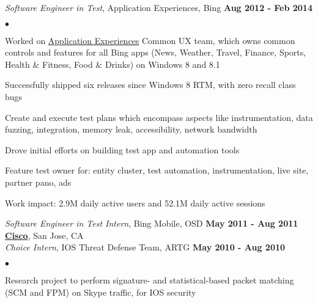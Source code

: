 \documentclass[margin,line]{res}
\newenvironment{list2}
  {\vspace{-4mm}
   \begin{list}{$\bullet$}{
     \setlength{\itemsep}{0in}
     \setlength{\parsep}{0in} \setlength{\parskip}{0in}
     \setlength{\topsep}{0in} \setlength{\partopsep}{0in}
     \setlength{\leftmargin}{0.18in}}}
  {\end{list}}
\begin{document}
\begin{resume}
{\em Software Engineer in Test}, Application Experiences, Bing                       \hfill {\bf Aug 2012 - Feb 2014} \\
\begin{list2}
\item Worked on \href{http://www.zdnet.com/microsofts-latest-search-share-attack-plan-focus-on-mobile-apps-7000008908/}{Application Experiences}
  Common UX team, which owns common controls and features for all Bing apps
  (News, Weather, Travel, Finance, Sports, Health \& Fitness, Food \& Drinks) on Windows 8 and 8.1
\item Successfully shipped six releases since Windows 8 RTM, with zero recall class bugs
\item Create and execute test plans which encompass aspects like instrumentation, data fuzzing, integration,
  memory leak, accessibility, network bandwidth
\item Drove initial efforts on building test app and automation tools
\item Feature test owner for: entity cluster, test automation, instrumentation, live site, partner pano, ads
\item Work impact: 2.9M daily active users and 52.1M daily active sessions
\end{list2}

{\em Software Engineer in Test Intern}, Bing Mobile, OSD          \hfill {\bf May 2011 - Aug 2011} \\

{\bf \href{http://cisco.com}{Cisco}}, San Jose, CA \\
{\em Choice Intern}, IOS Threat Defense Team, ARTG                \hfill {\bf May 2010 - Aug 2010}\\
\begin{list2}
\item Research project to perform signature- and statistical-based packet matching (SCM and FPM) on Skype traffic, for IOS security
\end{list2}


\end{resume}
\end{document}
